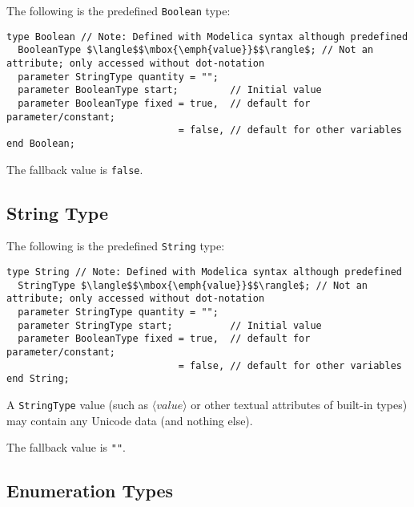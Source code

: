 The following is the predefined \lstinline!Boolean! type:
\begin{lstlisting}[language=modelica]
type Boolean // Note: Defined with Modelica syntax although predefined
  BooleanType $\langle$$\mbox{\emph{value}}$$\rangle$; // Not an attribute; only accessed without dot-notation
  parameter StringType quantity = "";
  parameter BooleanType start;         // Initial value
  parameter BooleanType fixed = true,  // default for parameter/constant;
                              = false, // default for other variables
end Boolean;
\end{lstlisting}%
%
%
%

The fallback value is \lstinline!false!.

\subsection{String Type}\label{string-type}

The following is the predefined \lstinline!String! type:
\begin{lstlisting}[language=modelica]
type String // Note: Defined with Modelica syntax although predefined
  StringType $\langle$$\mbox{\emph{value}}$$\rangle$; // Not an attribute; only accessed without dot-notation
  parameter StringType quantity = "";
  parameter StringType start;          // Initial value
  parameter BooleanType fixed = true,  // default for parameter/constant;
                              = false, // default for other variables
end String;
\end{lstlisting}%
%
%

A \lstinline!StringType! value (such as $\langle\mathit{value}\rangle$ or other textual attributes of built-in types) may contain any Unicode data (and nothing else).

The fallback value is \lstinline!""!.

\subsection{Enumeration Types}\label{enumeration-types}

